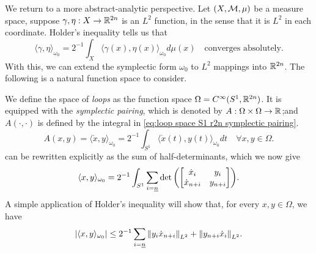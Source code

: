 \documentclass[../main-v2-manifolds.tex]{subfiles}
\begin{document}
%
%
%
%
%
%
We return to a more abstract-analytic perspective. Let $(X,\mathcal{M},\mu)$ be a measure space, suppose $\gamma, \eta: X\to {\mathbb{R}^{2n}}$ is an $L^2$ function, in the sense that it is $L^2$ in each coordinate. Holder's inequality tells us that
\[
    \langle \gamma,\eta\rangle_{\omega_0} = 2^{-1}\int_{X}\langle \gamma(x),\eta (x)\rangle_{\omega_0} d\mu(x)\quad\text{converges absolutely.}
\]
With this, we can extend the symplectic form $\omega_0$ to $L^2$ mappings into ${\mathbb{R}^{2n}}$. The following is a natural function space to consider.
\begin{definition}
    We define the space of \emph{loops} as the function space $\Omega = C^\infty(S^1, {\mathbb{R}^{2n}})$. It is equipped with the \emph{symplectic pairing}, which is denoted by $A:\Omega\times\Omega\to\mathbb{R}$;and $A(\cdot,\cdot)$ is defined by the integral in \cref{eq:loop space S1 r2n symplectic pairing}.
    \begin{equation}
        A(x,y) = \langle \mathring{x},y\rangle_{\omega_0}= 2^{-1}\int_{S^1} \langle \mathring{x}(t), y(t) \rangle_{\omega_0} dt\quad\forall x,y\in\Omega.
        \label{eq:loop space S1 r2n symplectic pairing}
    \end{equation}
     can be rewritten explicitly as the sum of half-determinants, which we now give
    \begin{equation}
        \langle x,y\rangle_{\omega_0} = 2^{-1}\int_{S^1} \sum_{i=\underline{n}}\det\qty(\mqty[\dot{x}_i & y_i \\ \dot{x}_{n+i} & y_{n+i}]).
        \label{eq:symplectic pairing loops r2n determinant formula}
    \end{equation}
    A simple application of Holder's inequality will show that, for every $x,y\in\Omega$, we have
    \[
        \vert {\langle x,y\rangle_{\omega_0}} \vert\leq 2^{-1}\sum_{i=\underline{n}}\norm{y_i\dot{x}_{n+i}}_{L^2} + \norm{y_{n+i}\dot{x}_{i}}_{L^2}.
    \]    
\end{definition}
\end{document}
